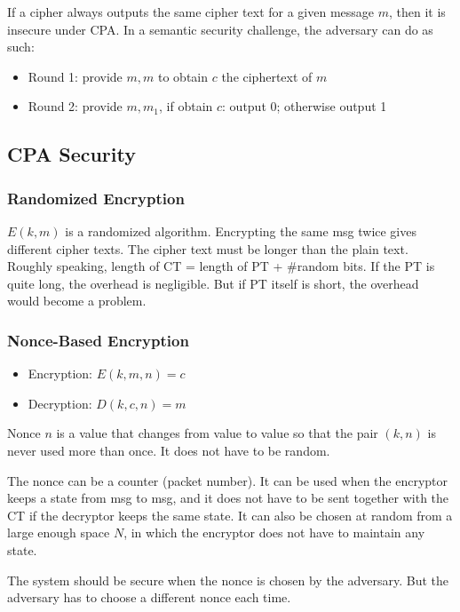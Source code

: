 If a cipher always outputs the same cipher text for a given message $m$, then it is insecure under CPA. In a semantic security challenge, the adversary can do as such:
\begin{itemize}
  \item Round 1: provide $m, m$ to obtain $c$ the ciphertext of $m$
  \item Round 2: provide $m, m_1$, if obtain $c$: output 0; otherwise output 1
\end{itemize}
\subsection{CPA Security}
\subsubsection{Randomized Encryption}
$E(k,m)$ is a randomized algorithm. Encrypting the same msg twice gives different cipher texts. The cipher text must be longer than the plain text. Roughly speaking, length of CT = length of PT + \#random bits. If the PT is quite long, the overhead is negligible. But if PT itself is short, the overhead would become a problem.
\subsubsection{Nonce-Based Encryption}
\begin{itemize}
\item Encryption: $E(k, m, n) = c$
\item Decryption: $D(k, c, n) = m$
\end{itemize}
Nonce $n$ is a value that changes from value to value so that the pair $(k,n)$ is never used more than once. It does not have to be random.

The nonce can be a counter (packet number). It can be used when the encryptor keeps a state from msg to msg, and it does not have to be sent together with the CT if the decryptor keeps the same state. It can also be chosen at random from a large enough space $N$, in which the encryptor does not have to maintain any state.

The system should be secure when the nonce is chosen by the adversary. But the adversary has  to choose a different nonce each time.
